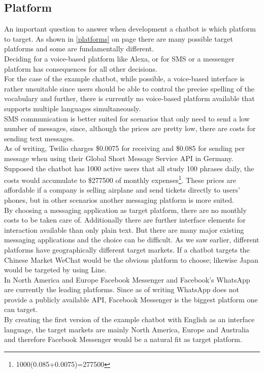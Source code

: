 \subsection{Platform}

An important question to answer when development a chatbot is which platform to target.
As shown in \ref{platforms} on page \pageref{platforms} there are many possible target platforms
and some are fundamentally different.
\\

Deciding for a voice-based platform like Alexa, or for SMS or a messenger platform has consequences
for all other decisions.
\\
For the case of the example chatbot, while possible, a voice-based interface is rather unsuitable since
users should be able to control the precise spelling of the vocabulary
and further, there is currently no voice-based platform available
that supports multiple languages simultaneously.
\\

SMS communication is better suited for scenarios that only need to send a low number of messages,
since, although the prices are pretty low, there are costs for sending text messages.
\\
As of writing, Twilio charges \$0.0075 for receiving and \$0.085 for sending per message when using their Global Short Message Service API in Germany\cite{twilio}.
\\
Supposed the chatbot has 1000 active users that all study 100 phrases daily,
the costs would accumulate to \$277500 of monthly expenses\footnote{1000\times(0.085+0.0075)=277500}.
These prices are affordable if a company is selling airplane and send tickets directly to users' phones,
but in other scenarios another messaging platform is more suited.
\\

By choosing a messaging application as target platform, there are no monthly costs to be taken care of.
Additionally there are further interface elements for interaction available than only plain text.
But there are many major existing messaging applications and the choice can be difficult.
As we saw earlier, different platforms have geographically different target markets.
If a chatbot targets the Chinese Market WeChat would be the obvious platform to choose;
likewise Japan would be targeted by using Line.
\\
In North America and Europe Facebook Messenger and Facebook's WhatsApp are currently the leading platforms.
Since as of writing WhatsApp does not provide a publicly available API, Facebook Messenger is the biggest platform one can target.
\\
By creating the first version of the example chatbot with English as an interface language,
the target markets are mainly North America, Europe and Australia and therefore Facebook Messenger would be a natural fit as target platform.
\\

